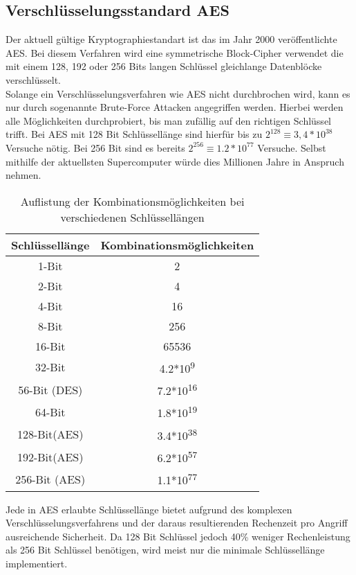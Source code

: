 \subsection{Verschlüsselungsstandard AES}\label{ss:AES}

Der aktuell gültige Kryptographiestandart ist das im Jahr 2000 veröffentlichte \ac{AES}. Bei diesem Verfahren wird eine symmetrische Block-Cipher verwendet die mit einem 128, 192 oder 256 Bits langen Schlüssel gleichlange Datenblöcke verschlüsselt\cite{ws:AES}.\\
Solange ein Verschlüsselungsverfahren wie \ac{AES} nicht durchbrochen wird, kann es nur durch sogenannte Brute-Force Attacken angegriffen werden. Hierbei werden alle Möglichkeiten durchprobiert, bis man zufällig auf den richtigen Schlüssel trifft. Bei \ac{AES} mit 128 Bit Schlüssellänge sind hierfür bis zu $2^{128}\equiv 3,4*10^{38}$ Versuche nötig. Bei 256 Bit sind es bereits $2^{256}\equiv 1.2*10^{77}$ Versuche. Selbst mithilfe der aktuellsten Supercomputer würde dies Millionen Jahre in Anspruch nehmen.\\

\begin{table}[H] 
	\centering
	\begin{tabular}{|c|c|}\hline
		Schlüssellänge & Kombinationsmöglichkeiten\\ \hline \hline
		1-Bit & 2 \\ \hline
		2-Bit & 4 \\ \hline
		4-Bit & 16 \\ \hline
		8-Bit & 256 \\ \hline
		16-Bit & 65536 \\ \hline
		32-Bit & 4.2*10\textsuperscript{9} \\ \hline
		56-Bit (DES) & 7.2*10\textsuperscript{16} \\ \hline
		64-Bit  & 1.8*10\textsuperscript{19} \\ \hline
		128-Bit(AES) & 3.4*10\textsuperscript{38} \\ \hline
		192-Bit(AES) & 6.2*10\textsuperscript{57} \\ \hline
		256-Bit (AES) &  1.1*10\textsuperscript{77} \\ \hline
	\end{tabular}
	\caption{Auflistung der Kombinationsmöglichkeiten bei verschiedenen Schlüssellängen}
	\label{t:keylength}
\end{table}
\vspace{5 mm}

Jede in \ac{AES} erlaubte Schlüssellänge bietet aufgrund des komplexen Verschlüsselungsverfahrens und der daraus resultierenden Rechenzeit pro Angriff ausreichende Sicherheit. Da 128 Bit Schlüssel jedoch 40\% weniger Rechenleistung als 256 Bit Schlüssel benötigen, wird meist nur die minimale Schlüssellänge implementiert. 